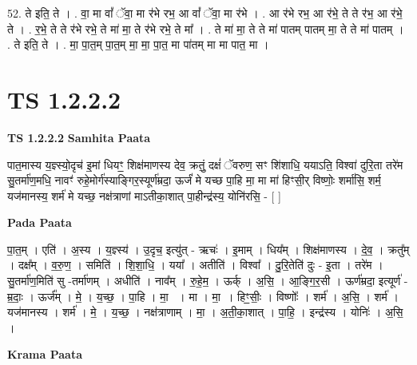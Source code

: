 \documentclass[17pt]{extarticle}
\begin{document}
52. ते इति॒ ते । . वा॒ मा वां᳚ ॅवा॒ मा र॑भे रभ॒ आ वां᳚ ॅवा॒ मा र॑भे । . आ र॑भे रभ॒ आ र॑भे॒ ते ते र॑भ॒ आ र॑भे॒ ते । . र॒भे॒ ते ते र॑भे रभे॒ ते मा॑ मा॒ ते र॑भे रभे॒ ते मा᳚ । . ते मा॑ मा॒ ते ते मा॑ पातम् पातम् मा॒ ते ते मा॑ पातम् । . ते इति॒ ते । . मा॒ पा॒त॒म् पा॒त॒म् मा॒ मा॒ पा॒त॒ मा पा॑तम् मा मा पात॒ मा । \newline
\pagebreak
{}

\section{ TS 1.2.2.2 }

\textbf{TS 1.2.2.2 } \newline
\textbf{Samhita Paata} \newline

पात॒मास्य य॒ज्ञ्स्यो॒दृच॑ इ॒मां धियꣳ॒॒ शिक्ष॑माणस्य देव॒ क्रतुं॒ दक्षं॑ ॅवरुण॒ सꣳ शि॑शाधि॒ ययाऽति॒ विश्वा॑ दुरि॒ता तरे॑म सु॒तर्मा॑ण॒मधि॒ नावꣳ॑ रुहे॒मोर्ग॑स्याङ्गिर॒स्यूर्ण॑म्रदा॒ ऊर्जं॑ मे यच्छ पा॒हि मा॒ मा मा॑ हिꣳसी॒र् विष्णोः॒ शर्मा॑सि॒ शर्म॒ यज॑मानस्य॒ शर्म॑ मे यच्छ॒ नक्ष॑त्राणां माऽतीका॒शात् पा॒हीन्द्र॑स्य॒ योनि॑रसि॒ - [ ] \newline

\textbf{Pada Paata} \newline

पा॒त॒म् । एति॑ । अ॒स्य । य॒ज्ञ्स्य॑ । उ॒दृच॒ इत्यु॑त् - ऋचः॑ । इ॒माम् । धिय᳚म् । शिक्ष॑माणस्य । दे॒व॒ । क्रतु᳚म् । दक्ष᳚म् । व॒रु॒ण॒ । समिति॑ । शि॒शा॒धि॒ । यया᳚ । अतीति॑ । विश्वा᳚ । दु॒रि॒तेति॑ दुः - इ॒ता । तरे॑म । सु॒तर्मा॑ण॒मिति॑ सु -तर्मा॑णम् । अधीति॑ । नाव᳚म् । रु॒हे॒म॒ । ऊर्क् । अ॒सि॒ । आ॒ङ्गि॒र॒सी । ऊर्ण॑म्रदा॒ इत्यूर्ण॑ - म्र॒दाः॒ । ऊर्ज᳚म् । मे॒ । य॒च्छ॒ । पा॒हि । मा॒  । मा । मा॒ । हिꣳ॒॒सीः॒ । विष्णोः᳚ । शर्म॑ । अ॒सि॒ । शर्म॑ । यज॑मानस्य । शर्म॑ । मे॒ । य॒च्छ॒ । नक्ष॑त्राणाम् । मा॒ । अ॒ती॒का॒शात् । पा॒हि॒ । इन्द्र॑स्य । योनिः॑ । अ॒सि॒ ।  \newline


\textbf{Krama Paata} \newline
\end{document}
